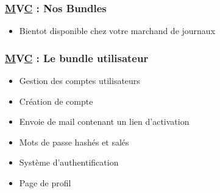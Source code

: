 
\begin{frame}
  \frametitle{\underline{M}V\underline{C} : Nos Bundles}
  \begin{itemize}
  \item Bientot disponible chez votre marchand de journaux 
  \end{itemize}
\end{frame}


\begin{frame}
  \frametitle{\underline{M}V\underline{C} : Le bundle utilisateur}
  \begin{itemize}
  \item Gestion des comptes utilisateurs
  \item Création de compte
  \item Envoie de mail contenant un lien d'activation
  \item Mots de passe hashés et salés
  \item Système d'authentification
  \item Page de profil 
  \end{itemize}
\end{frame}
